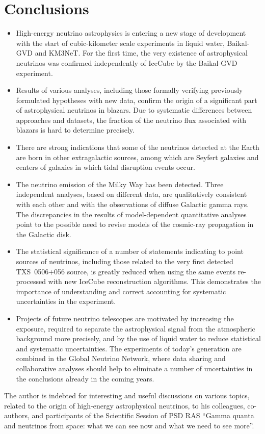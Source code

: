 \documentclass[a4paper,noshowpacs,noshowkeys,floatfix,twocolumn,preprintnumbers,nofootinbib]{revtex4-2}
\begin{document}
\section{Conclusions}
\label{sec:concl}
\begin{itemize}
 \item
High-energy neutrino astrophysics is entering a new stage of development with the start of cubic-kilometer scale experiments in liquid water, Baikal-GVD and KM3NeT. For the first time, the very existence of astrophysical neutrinos was confirmed independently of IceCube by the Baikal-GVD experiment.
 \item
Results of various analyses, including those formally verifying previously formulated hypotheses with new data, confirm the origin of a significant part of astrophysical neutrinos in blazars. Due to systematic differences between approaches and datasets, the fraction of the neutrino flux associated with blazars is hard to determine precisely.
 \item
There are strong indications that some of the neutrinos detected at the Earth are born in other extragalactic sources, among which are  Seyfert galaxies and centers of galaxies in which tidal disruption events occur.
 \item
The neutrino emission of the Milky Way has been detected. Three independent analyses, based on different data, are qualitatively consistent with each other and with the observations of diffuse Galactic gamma rays. The discrepancies in the results of model-dependent quantitative analyses point to the possible need to revise models of the cosmic-ray propagation in the Galactic disk.
 \item
The statistical significance of a number of statements indicating to point sources of neutrinos, including those related to the very first detected TXS~0506$+$056 source, is greatly reduced when using the same events re-processed with new IceCube reconstruction algorithms. This demonstrates the importance of understanding and correct accounting for systematic uncertainties in the experiment.
 \item
Projects of future neutrino telescopes are motivated by increasing the exposure, required to separate the astrophysical signal from the atmospheric background more precisely, and by the use of liquid water to reduce statistical and systematic uncertainties. The experiments of today's generation are combined in the Global Neutrino Network, where data sharing and collaborative analyses should help to eliminate a number of uncertainties in the conclusions already in the coming years.
\end{itemize}

The author is indebted for interesting and useful discussions on various topics, related to the origin of high-energy astrophysical neutrinos, to his colleagues, co-authors, and participants of the Scientific Session of PSD RAS ``Gamma quanta and neutrinos from space: what we can see now and what we need to see more''.



\end{document}
